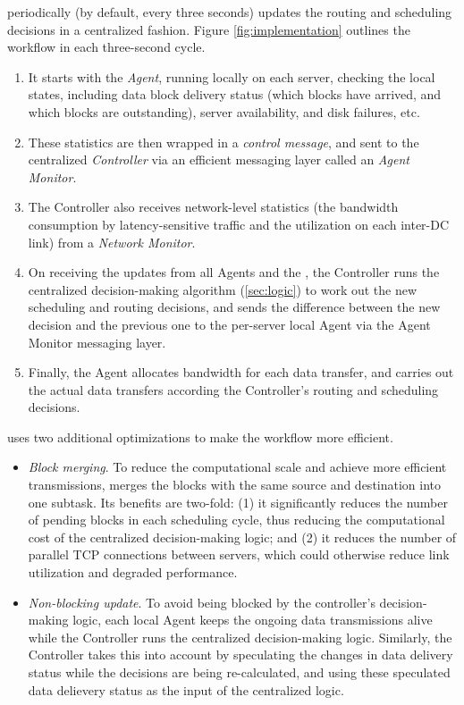 \name periodically (by default, every three seconds) updates the
routing and scheduling decisions in a centralized fashion.
Figure \ref{fig:implementation} outlines the workflow in each
three-second cycle.
\begin{enumerate}
\item It starts with the {\em Agent}, running locally on each server,
checking the local states, including data block delivery status
(which blocks have arrived, and which blocks are outstanding),
server availability, and disk failures, etc.
\item These statistics are then wrapped in a {\em control message},
and sent to the centralized {\em \name Controller} via an efficient
messaging layer called an {\em Agent Monitor}.
\item The \name Controller also receives network-level statistics
(the bandwidth consumption by latency-sensitive traffic and the
utilization on each inter-DC link) from a {\em Network Monitor}.
\item On receiving the updates from all Agents and the , the \name Controller runs the centralized decision-making
algorithm (\Section\ref{sec:logic}) to work out the new scheduling
and routing decisions, and sends the difference between the new
decision and the previous one to the per-server local Agent via
the Agent Monitor messaging layer.
\item Finally, the Agent allocates bandwidth for each data transfer,
and carries out the actual data transfers according the Controller's
routing and scheduling decisions.
\end{enumerate}


\name uses two additional optimizations to make the workflow
more efficient.
\begin{itemize}
\item \emph{Block merging}.
To reduce the computational scale and achieve more efficient
transmissions, \name merges the blocks with the same source and
destination into one subtask. Its benefits are two-fold: (1) it
significantly reduces the number of pending blocks in each
scheduling cycle, thus reducing the computational cost of the
centralized decision-making logic; and (2) it reduces the number
of parallel TCP connections between servers, which could
otherwise reduce link utilization and degraded performance.
\item \emph{Non-blocking update}.
To avoid being blocked by the controller's decision-making logic,
each local Agent  keeps the ongoing data transmissions alive while
the Controller runs the centralized decision-making logic.
Similarly, the Controller takes this into account by speculating
the changes in data delivery status while the decisions are being
re-calculated, and using these speculated data delievery status as
the input of the centralized logic.
\end{itemize}

